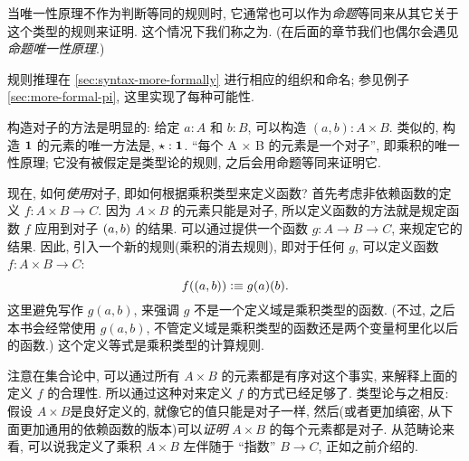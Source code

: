 \begin{rmk}
\begin{enumerate}
        当唯一性原理不作为判断等同的规则时, 它通常也可以作为\emph{命题}等同来从其它关于这个类型的规则来证明.
        这个情况下我们称之为.
        (在后面的章节我们也偶尔会遇见\emph{命题唯一性原理}.)
    \end{enumerate}
    规则推理在 \cref{sec:syntax-more-formally} 进行相应的组织和命名;
    参见例子 \cref{sec:more-formal-pi}, 这里实现了每种可能性.
\end{rmk}

构造对子的方法是明显的: 给定 $a:A$ 和 $b:B$, 可以构造 $(a,b):A\times B$.
类似的, 构造 $\mathbf{1}$ 的元素的唯一方法是, $\star:\mathbf{1}$.
``每个 A × B 的元素是一个对子'', 即乘积的唯一性原理;
它没有被假定是类型论的规则, 之后会用命题等同来证明它.

现在, 如何\emph{使用}对子, 即如何根据乘积类型来定义函数?
首先考虑非依赖函数的定义 $f : A\times B \to C$.
因为 $A\times B$ 的元素只能是对子, 所以定义函数的方法就是规定函数 $f$ 应用到对子 $(a,b)$ 的结果.
可以通过提供一个函数 $g : A \to B \to C$, 来规定它的结果.
因此, 引入一个新的规则(乘积的消去规则), 即对于任何 $g$, 可以定义函数 $f : A\times B \to C$:
\[
    f((a,b)) \vcentcolon\equiv g(a)(b).
\]
这里避免写作 $g(a,b)$, 来强调 $g$ 不是一个定义域是乘积类型的函数.
(不过, 之后本书会经常使用 $g(a,b)$, 不管定义域是乘积类型的函数还是两个变量柯里化以后的函数.)
这个定义等式是乘积类型的计算规则.

注意在集合论中, 可以通过所有 $A\times B$ 的元素都是有序对这个事实, 来解释上面的定义 $f$ 的合理性.
所以通过这种对来定义 $f$ 的方式已经足够了.
类型论与之相反: 假设 $A\times B$是良好定义的, 就像它的值只能是对子一样, 然后(或者更加缜密, 从下面更加通用的依赖函数的版本)可以\emph{证明} $A\times B$ 的每个元素都是对子.
从范畴论来看, 可以说我定义了乘积 $A\times B$ 左伴随于 ``指数'' $B\to C$, 正如之前介绍的.

